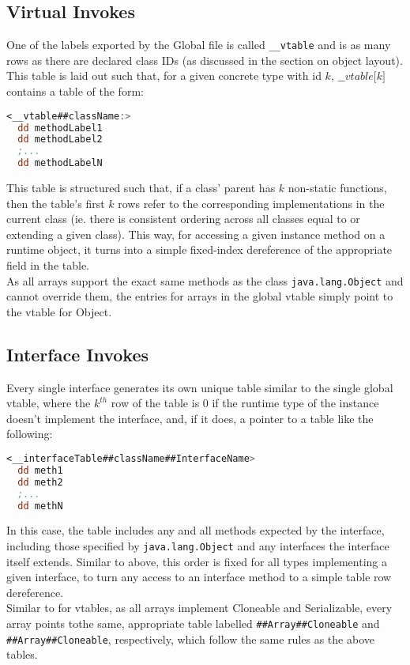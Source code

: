 \documentclass{article}
\begin{document}
\subsection{Virtual Invokes}
One of the labels exported by the Global file is called \texttt{\_\_vtable} and is as many rows as there are declared class IDs (as discussed in the section on object layout). This table is laid out such that, for a given concrete type with id $k$, $\_\_vtable\lbrack k \rbrack$ contains a table of the form:
\begin{lstlisting}[language=nasm]
 <__vtable##className:>
  dd methodLabel1
  dd methodLabel2
  ;...
  dd methodLabelN
\end{lstlisting}
This table is structured such that, if a class' parent has $k$ non-static functions, then the table's first $k$ rows refer to the corresponding implementations in the current class (ie. there is consistent ordering across all classes equal to or extending a given class). This way, for accessing a given instance method on a runtime object, it turns into a simple fixed-index dereference of the appropriate field in the table.\\
As all arrays support the exact same methods as the class \texttt{java.lang.Object} and cannot override them, the entries for arrays in the global vtable simply point to the vtable for Object.

\subsection{Interface Invokes}
Every single interface generates its own unique table similar to the single global vtable, where the $k^{th}$ row of the table is $0$ if the runtime type of the instance doesn't implement the interface, and, if it does, a pointer to a table like the following:
\begin{lstlisting}[language=nasm]
<__interfaceTable##className##InterfaceName>
  dd meth1
  dd meth2
  ;...
  dd methN
\end{lstlisting}
In this case, the table includes any and all methods expected by the interface, including those specified by \texttt{java.lang.Object} and any interfaces the interface itself extends. Similar to above, this order is fixed for all types implementing a given interface, to turn any access to an interface method to a simple table row dereference.\\

Similar to for vtables, as all arrays implement Cloneable and Serializable, every array points tothe same, appropriate table labelled \texttt{\#\#Array\#\#Cloneable} and \texttt{\#\#Array\#\#Cloneable}, respectively, which follow the same rules as the above tables.
\end{document}
